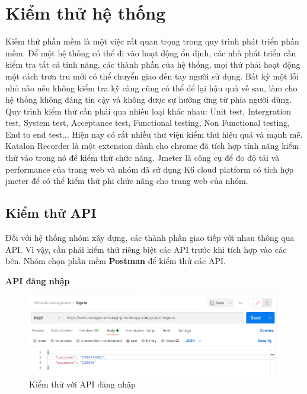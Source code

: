 \chapter{Kiểm thử hệ thống}\label{chap:testing}
		Kiếm thử phần mềm là một việc rất quan trọng trong quy trình phát triển phần mềm.
        Để một hệ thống có thể đi vào hoạt động ổn định, các nhà phát triển cần kiểm tra tất
        cả tính năng, các thành phần của hệ thống, mọi thứ phải hoạt động một cách trơn tru
        mới có thể chuyển giao đến tay người sử dụng. Bất kỳ một lỗi nhỏ nào nếu không kiểm
        tra kỹ càng cũng có thể để lại hậu quả về sau, làm cho hệ thống không đáng tin cậy và
        không được sự hưởng ứng từ phía người dùng.\\
        
        Quy trình kiểm thử cần phải qua nhiều loại khác nhau: Unit test, Intergration test, System test, Acceptance test, Functional testing, Non Functional testing, End to end test... Hiện nay có rất nhiều thư viện kiểm thử hiệu quả và mạnh mẽ. Katalon Recorder là một extension dành cho chrome đã tích hợp tính năng kiểm thử vào trong nó để kiểm thử chức năng. Jmeter là công cụ để đo độ tải và performance của trang web và nhóm đã sử dụng K6 cloud platform có tích hợp jmeter để có thể kiểm thử phi chức năng cho trang web của nhóm.
		\section{Kiểm thử API}
		Đối với hệ thống nhóm xây dựng, các thành phần giao tiếp với nhau thông qua API. Vì vậy, cần phải kiểm thử riêng biệt các API trước khi tích hợp vào các bên. Nhóm chọn phần mềm \textbf{Postman} để kiểm thử các API.\\
		
		\newpage
		
		\textbf{API đăng nhập}
		
		\begin{figure}[H]
			\includegraphics[width=1\textwidth]{Images/testing/API-sign-in.png}
			\centering
			\linebreak
			\caption{Kiểm thử với API đăng nhập}
		\end{figure}

